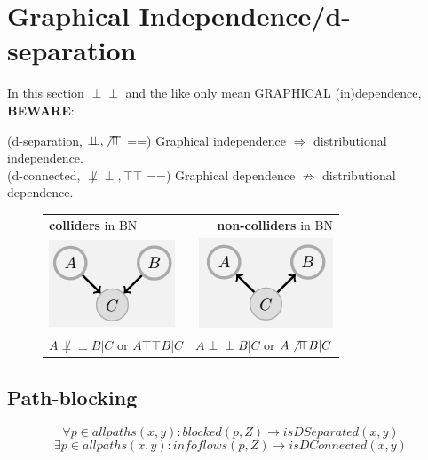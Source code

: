 \documentclass[a4paper,10pt]{article}
\newcommand{\negspace}{\!\!\!}
\newcommand{\idp}{\perp \negspace \perp}
\newcommand{\nidp}{\not \idp}
\newcommand{\dep}{\top \negspace \top}
\newcommand{\ndep}{\not \dep}
\begin{document}
\newpage
\section{Graphical Independence/d-separation}
In this section $\idp$ and the like only mean GRAPHICAL (in)dependence, \textbf{BEWARE}:\\
\begin{flushright}
(d-separation, $\idp, \ndep$ ==)  Graphical independence $\Rightarrow$ distributional independence. \\
(d-connected, $\nidp,\dep$ ==)  Graphical dependence $\not \Rightarrow$ distributional dependence. 
\end{flushright}




\begin{figure}[htb!]
\begin{tabular}{l||r}
\textbf{colliders} in BN & \textbf{non-colliders} in BN \\
\includegraphics{gcollider.png} & \includegraphics{gnocol.png}  \\
 \large $ A \nidp B | C$ or $ A \dep B | C$ & \large $ A \idp B | C$ or $ A \ndep B | C$ \\
\end{tabular}
\centering
\end{figure}

\subsection{Path-blocking} 
$$\forall p \in allpaths(x,y): blocked(p,Z) \rightarrow isDSeparated(x,y) $$
$$\exists p \in allpaths(x,y): infoflows(p,Z) \rightarrow isDConnected(x,y) $$
\end{document}
